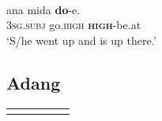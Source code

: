 \ea%
\label{ex:7:20}
 \\
\gll  {\textglotstop}ana  mida  \textbf{do}-{\textglotstop}e.  \\
  \textsc{3sg.subj} go.\textsc{high} \textbf{\textsc{high}}-be.at     \\
\glt   `S/he went up and is up there.'
\z







\subsection{Adang}\label{sec:7:3.5}

\begin{table}
\begin{tabular}{>{\sc}l>{\sc}l>{\it}l>{\it}l>{\it}l}
\lsptoprule


\end{tabular}
\end{table}
